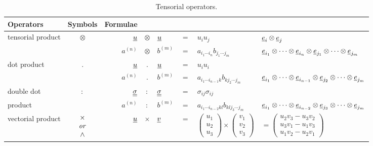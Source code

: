 \begin{table}[!hptb]
\centering
\begin{tabular}{l| c| r@{ \,}c@{\,}l  @{\,}c@{\,}l @{\,}l }
Operators & Symbols & Formulae \\
\hline
tensorial product & $\otimes$ & $\underline{u} $ & $ \otimes $ & $\underline{u}$ & $= $& $u_i u_j $&  $ \underline{e}_i \otimes \underline{e}_j $ \\
                         &                  & $a^{(n)}$ & $ \otimes $ & $b^{(m)} $& $= $&  $a_{i_1  \cdots i_n} b_{j_1  \cdots j_m}$ & $\underline{e}_{i_1} \otimes \cdots \otimes \underline{e}_{i_n} \otimes \underline{e}_{j_1} \otimes \cdots \otimes \underline{e}_{j_m} $ \\
\hline
dot product&$.$ & $\underline{u} $&$ . $&$\underline{u} $&$ = $&$ u_i u_i  $ \\
                          & &$ a^{(n)} $&$ . $&$ b^{(m)} $&$ = $&$ a_{i_1  \cdots i_{n-1}k} b_{k j_2  \cdots j_m} $&$ \underline{e}_{i_1} \otimes \cdots \otimes \underline{e}_{i_{n-1}} \otimes \underline{e}_{j_2} \otimes \cdots \otimes \underline{e}_{j_m} $ \\
\hline
double dot &$ : $&$ \underline{\underline{\sigma}} $&$ : $&$ \underline{\underline{\sigma}} $&$ = $&$ \sigma_{ij} \sigma_{ij}    $ \\
       product& &$ a^{(n)} $&$ : $&$ b^{(m)} $&$ = $&$ a_{i_1  \cdots i_{n-2}kl} b_{k l j_3  \cdots j_m} $&$ \underline{e}_{i_1} \otimes \cdots \otimes \underline{e}_{i_{n-2}} \otimes \underline{e}_{j_3} \otimes \cdots \otimes \underline{e}_{j_m} $ \\
\hline
vectorial product &
$
\begin{array}{c}
 \times \\
\textrm{ \emph{or} } \\
\wedge
\end{array}
$
&$ \underline{u} $&$ \times $&$ \underline{v} $&$ = $&
$ \left( \begin{array}{c}
u_1\\
u_2 \\
u_3
\end{array} \right) \times
\left( \begin{array}{c}
v_1\\
v_2 \\
v_3
\end{array} \right)  $
&$ =
\left( \begin{array}{c}
u_2 v_3 - u_3 v_2\\
u_3 v_1 - u_1 v_3 \\
u_1 v_2 - u_2 v_1
\end{array} \right)
 $
\end{tabular}
\caption{Tensorial operators.}
\end{table}

